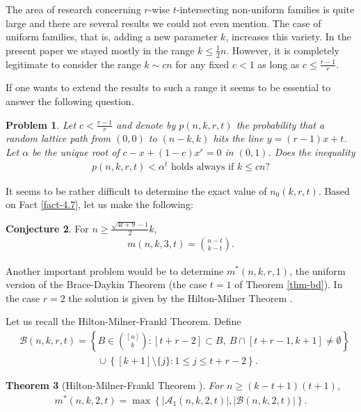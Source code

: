 \documentclass[11pt,a4paper]{article}
\newtheorem{thm}{Theorem}[section]
\newtheorem{prob}[thm]{Problem}
\newtheorem{false statement}{False statement}
\theoremstyle{definition}
\newtheorem{conj}[thm]{Conjecture}
\def\ha{\mathcal{A}}
\def\hb{\mathcal{B}}
\begin{document}
The area of research concerning $r$-wise $t$-intersecting non-uniform families is quite large and there are several results we could not even mention. The case of uniform families, that is, adding a new parameter $k$, increases this variety. In the present paper we stayed mostly in the range $k\leq \frac{1}{2}n$. However, it is completely legitimate to consider the range $k\sim cn$ for any fixed $c<1$ as long as $c\leq \frac{r-1}{r}$.

If one wants to extend the results to such a range it seems to be essential to answer the following question.

\begin{prob}
Let $c<\frac{r-1}{r}$ and denote by $p(n,k,r,t)$ the probability that a random lattice path from $(0,0)$ to $(n-k,k)$ hits the line $y=(r-1)x+t$. Let $\alpha$ be the unique root of $c-x+(1-c)x^r=0$ in $(0,1)$. Does the inequality
\begin{align}
p(n,k,r,t) <\alpha^t \mbox{ holds always if }k\leq cn?
\end{align}
\end{prob}

It seems to be rather difficult to determine the exact value of $n_0(k,r,t)$. Based on Fact \ref{fact-4.7}, let us make the following:

\begin{conj}
For $n\geq  \frac{\sqrt{4t+9}-1}{2}k$,
\begin{align*}
m(n,k,3,t) =\binom{n-t}{k-t}.
\end{align*}
\end{conj}

Another  important problem would be to determine $m^*(n,k,r,1)$, the uniform version of the Brace-Daykin Theorem (the case $t=1$ of Theorem \ref{thm-bd}). In the case $r=2$ the solution is given by the Hilton-Milner Theorem \cite{HM}.

Let us recall the Hilton-Milner-Frankl Theorem. Define
\begin{align*}
&\hb(n,k,r,t) =\left\{B\in \binom{[n]}{k}\colon [t+r-2]\subset B,\  B\cap [t+r-1,k+1]\neq \emptyset\right\}\\[2pt]
&\qquad\qquad\qquad\qquad\cup \left\{[k+1]\setminus \{j\}\colon 1\leq j\leq t+r-2\right\}.
\end{align*}


\begin{thm}[Hilton-Milner-Frankl Theorem \cite{HM,F78-2,AK0}]
For $n\geq (k-t+1)(t+1)$,
\begin{align}\label{ineq-hmfrankl}
m^*(n,k,2,t)=\max\left\{|\ha_1(n,k,2,t)|,|\hb(n,k,2,t)|\right\}.
\end{align}
\end{thm}
\end{document}
